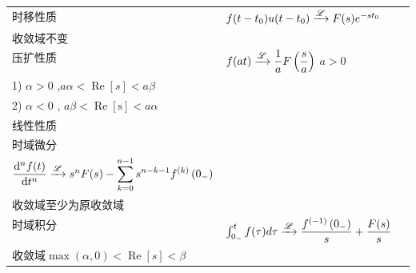 \documentclass[cn,11pt,chinese,black,simple]{../elegantbook}
\begin{document}
\begin{longtable}{lll}
    时移性质 & \(f(t-t_0)u(t-t_0) \xrightarrow{\mathscr{L}} F(s) e^{-s t_0}\) & \begin{tabular}[c]{@{}l@{}}\(f(t-t_0) \lta F_B(s) e^{-s t_0}\) \\ 收敛域不变\end{tabular}\\
    压扩性质  & \(f(a t) \xrightarrow{\mathscr{L}} \dfrac{1}{a} F\left(\dfrac{s}{a}\right)\) \(a > 0\)
                                                                                                                                                                                      & \begin{tabular}[c]{@{}l@{}}\(f(a t) \lta \dfrac{1}{\abs{a}} F_B\left(\dfrac{s}{a}\right)\)\\ 1)  $\alpha>0$ ,$a \alpha<\operatorname{Re}[s]<a \beta$\\ 2) $\alpha<0$ , $a \beta<\operatorname{Re}[\mathrm{s}]<a \alpha$\end{tabular} \\
    线性性质  &                                                                                                                                                                                                         &                                                                                                                                                                                                                                    \\
    时域微分  & \begin{tabular}[c]{@{}l@{}}$\dfrac{\dd{f(t)}}{\dd{t}} \lta s F(s) - f(0_-)$\\ $\dfrac{\mathrm{d}^n f(t)}{\mathrm{d}t^n} \xrightarrow{\mathscr{L}} s ^{n} F ( s )-\displaystyle\sum_{k=0}^{n-1} s ^{n-k-1} f ^{(k)}\left( 0 _{-}\right)$\end{tabular} & \begin{tabular}[c]{@{}l@{}}$\dfrac{\dd{^n f(t)}}{\dd{t^n}} \lta s ^{n} F ( s )$\\ 收敛域至少为原收敛域\end{tabular}                                                                                                                           \\
    时域积分  & $\int_{0_{-}}^{t} f(\tau) d \tau \xrightarrow{\mathscr{L}} \dfrac{f^{(-1)}\left(0_{-}\right)}{s}+\dfrac{F(s)}{s}$                                                                                                              & \begin{tabular}[c]{@{}l@{}}$\int_{0_{-}}^{t} f(\tau) d \tau \lta \dfrac{F(s)}{s}$\\ 收敛域$\max (\alpha, 0)<\operatorname{Re}[s]<\beta$\end{tabular}                                                                                   \\

\end{longtable}
\end{document}
